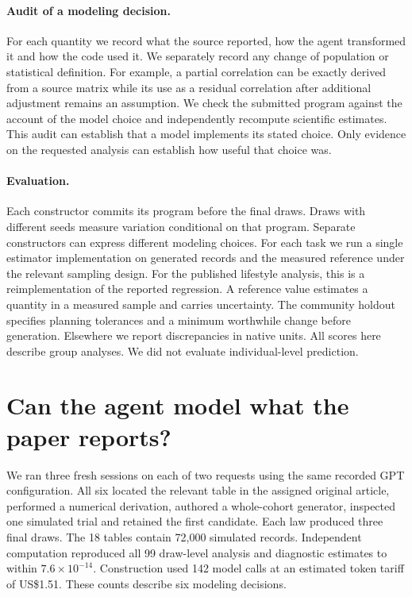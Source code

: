 \documentclass[sigconf,anonymous,review]{acmart}
\begin{document}
\paragraph{Audit of a modeling decision.}
For each quantity we record what the source reported, how the agent transformed it and how the code used it. We separately record any change of population or statistical definition. For example, a partial correlation can be exactly derived from a source matrix while its use as a residual correlation after additional adjustment remains an assumption. We check the submitted program against the account of the model choice and independently recompute scientific estimates. This audit can establish that a model implements its stated choice. Only evidence on the requested analysis can establish how useful that choice was.

\paragraph{Evaluation.}
Each constructor commits its program before the final draws. Draws with different seeds measure variation conditional on that program. Separate constructors can express different modeling choices. For each task we run a single estimator implementation on generated records and the measured reference under the relevant sampling design. For the published lifestyle analysis, this is a reimplementation of the reported regression. A reference value estimates a quantity in a measured sample and carries uncertainty. The community holdout specifies planning tolerances and a minimum worthwhile change before generation. Elsewhere we report discrepancies in native units. All scores here describe group analyses. We did not evaluate individual-level prediction.

\section{Can the agent model what the paper reports?}
\label{sec:original}
We ran three fresh sessions on each of two requests using the same recorded GPT configuration. All six located the relevant table in the assigned original article, performed a numerical derivation, authored a whole-cohort generator, inspected one simulated trial and retained the first candidate. Each law produced three final draws. The 18 tables contain 72,000 simulated records. Independent computation reproduced all 99 draw-level analysis and diagnostic estimates to within $7.6\times10^{-14}$. Construction used 142 model calls at an estimated token tariff of US\$1.51. These counts describe six modeling decisions.
\end{document}
